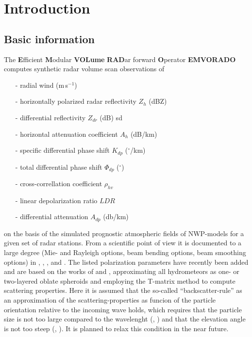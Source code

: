 \documentclass[10pt,a4paper,twoside,headinclude,footinclude,parskip=half]{scrartcl}
\newcommand{\myaktuellesection}{sec:intro}%
\newcommand{\labelsec}[1]{\label{#1}\renewcommand{\myaktuellesection}{#1}}%
\newcommand{\labelsec}[1]{\label{#1}}%
\newcommand{\grad}{\ensuremath{^{\circ}}\xspace}
\newcommand{\citeP}[1]{\citet{#1}}
\newcommand{\citeNPK}[1]{\citeauthor{#1}, \citeyear{#1}}
\begin{document}
\clearpage

\section{Introduction}
\labelsec{sec:intro}


\subsection{Basic information}

\labelsec{sec:intro:basic}

The \textbf{E}fficient \textbf{M}odular \textbf{VOLume} \textbf{RAD}ar forward \textbf{O}perator \textbf{EMVORADO} computes
synthetic radar volume scan observations of
\begin{itemize}
\item[-] radial wind (m\,s$^{-1}$)
\item[-] horizontally polarized radar reflectivity $Z_h$ (dBZ)
\item[-] differential reflectivity $Z_{dr}$ (dB)
sd\item[-] horizontal attenuation coefficient $A_h$ (dB/km)
\item[-] specific differential phase shift $K_{dp}$ (\grad/km)
\item[-] total differential phase shift $\Phi_{dp}$ (\grad)
\item[-] cross-correllation coefficient $\rho_{hv}$
\item[-] linear depolarization ratio $LDR$
\item[-] differential attenuation $A_{dp}$ (db/km)
\end{itemize}
on the basis of the simulated prognostic atmospheric fields of NWP-models for a given set of radar stations. 
From a scientific point of view it is documented to a large degree (Mie- and Rayleigh options, beam bending options, beam smoothing options) in \citeP{blahak2016a}, \citeP{zeng2013}, \citeP{jerger2014}, \citeP{zeng2014} and \citeP{zeng2016a}.
The listed polarization parameters have recently been added and are based on the works of \citeP{ryzhkov2001} and  \citeP{ryzhkov2011}, approximating all hydrometeors
as one- or two-layered oblate spheroids and employing the T-matrix method to compute scattering properties. Here it is assumed that the so-called
``backscatter-rule'' as an approximation of the scattering-properties as funcion of the particle orientation relative to the incoming wave holds,
which requires that the particle size is not too large compared to the wavelenght (\citeNPK{ryzhkov2001}) and that the elevation angle is not too steep (\citeNPK{ryzhkov2011}). It is planned to relax this condition in the
near future.
\end{document}
